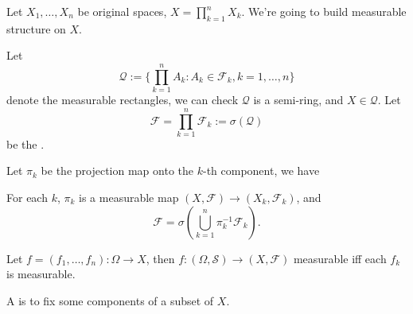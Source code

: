 Let $X_1, \dots, X_n$ be original spaces, $X = \prod_{k=1}^n X_k$.
We're going to build measurable structure on $X$.

Let
\[
\mathscr{Q} := \{\prod_{k=1}^n A_k : A_k \in \mathscr{F}_k, k = 1,\dots, n\}
\]
denote the measurable rectangles, we can check $\mathscr{Q}$ is a semi-ring,
and $X \in \mathscr{Q}$.
Let
\[
\mathscr{F} = \prod_{k=1}^n \mathscr{F}_k := \sigma(\mathscr{Q})
\]
be the .

Let $\pi_k$ be the projection map onto the $k$-th component,
we have
\begin{proposition}
	For each $k$, $\pi_k$ is a measurable
	map $(X, \mathscr{F}) \to (X_k, \mathscr{F}_k)$, and
	\[
		\mathscr{F} = \sigma\left(\bigcup_{k=1}^n \pi_k^{-1}\mathscr{F}_k\right).
	\]
\end{proposition}

\begin{theorem}
    Let $f = (f_1, \dots, f_n): \Omega\to X$, then $f:(\Omega, \mathscr{S})\to
	(X, \mathscr{F})$ measurable iff each $f_k$ is measurable.
\end{theorem}

A  is to fix some components of a subset of $X$.
